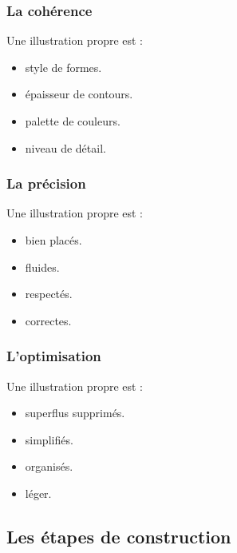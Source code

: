 \subsubsection{La cohérence}

Une illustration propre est  :

\begin{itemize}
    \item {} style de formes.
    \item {} épaisseur de contours.
    \item {} palette de couleurs.
    \item {} niveau de détail.
\end{itemize}

\subsubsection{La précision}

Une illustration propre est  :

\begin{itemize}
    \item {} bien placés.
    \item {} fluides.
    \item {} respectés.
    \item {} correctes.
\end{itemize}

\subsubsection{L'optimisation}

Une illustration propre est  :

\begin{itemize}
    \item {} superflus supprimés.
    \item {} simplifiés.
    \item {} organisés.
    \item {} léger.
\end{itemize}

\subsection{Les étapes de construction}

